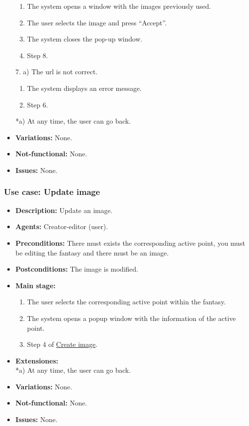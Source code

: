 \begin{itemize}
\begin{enumerate}
		\item The system opens a window with the images previously used.
		\item The user selects the image and press ``Accept''.
		\item The system closes the pop-up window.
		\item Step 8.
	\end{enumerate}
	7. a) The url is not correct.
	\begin{enumerate}
		\item The system displays an error message.
		\item Step 6.
	\end{enumerate}
	*a) At any time, the user can go back.
	\item \textbf{Variations:} None.
	\item \textbf{Not-functional:} None.
	\item \textbf{Issues:} None. %
\end{itemize}

\subsubsection{Use case: Update image}
\begin{itemize}
	\item \textbf{Description:} Update an image.
	\item \textbf{Agents:} Creator-editor (user).
	\item \textbf{Preconditions:} There must exists the corresponding active point, you must be editing the fantasy and there must be an image.
	\item \textbf{Postconditions:} The image is modified.
	\item \textbf{Main stage:}
	\begin{enumerate}
		\item The user selects the corresponding active point within the fantasy.
		\item The system opens a popup window with the information of the active point.
		\item Step 4 of \hyperlink{crearimagen}{Create image}.
	\end{enumerate}
	\item \textbf{Extensiones:} \\ *a) At any time, the user can go back.
	\item \textbf{Variations:} None.
	\item \textbf{Not-functional:} None.
	\item \textbf{Issues:} None.
\end{itemize}

